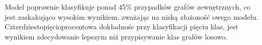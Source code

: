 Model poprawnie klasyfikuje ponad 45\% przypadków grafów zewnętrznych,
co jest zaskakująco wysokim wynikiem, zważając na niską złożoność owego modelu.
Czterdziestopięcioprocentowa dokładnośc przy klasyfikacji pięciu klas,
jest wynikiem zdecydowanie lepszym niż przypisywanie klas grafów losowo.



